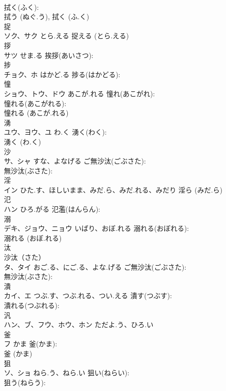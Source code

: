 \documentclass[8pt]{extreport}
\begin{document}
\begin{CJK}{UTF8}{min}
\\	拭く(ふく): 
\\	拭う (ぬぐ.う), 拭く (ふ.く)
\\	捉			
\\	ソク、サク	とら.える		捉える (とら.える)
\\	拶			
\\	サツ	せま.る	挨拶(あいさつ): 
\\	捗			
\\	チョク、ホ	はかど.る	捗る(はかどる): 
\\	憧			
\\	ショウ、トウ、ドウ	あこが.れる	憧れ(あこがれ): 
\\	憧れる(あこがれる): 
\\	憧れる (あこが.れる)
\\	湧			
\\	ユウ、ヨウ、ユ	わ.く	湧く(わく): 
\\	湧く (わ.く)
\\	沙			
\\	サ、シャ	すな、よなげる	ご無沙汰(ごぶさた): 
\\	無沙汰(ぶさた): 
\\	淫			
\\	イン	ひた.す、ほしいまま、みだ.ら、みだ.れる、みだり		淫ら (みだ.ら)
\\	氾			
\\	ハン	ひろ.がる	氾濫(はんらん): 
\\	溺			
\\	デキ、ジョウ、ニョウ	いばり、おぼ.れる	溺れる(おぼれる): 
\\	溺れる (おぼ.れる)
\\	汰			
\\	沙汰（さた）
\\	タ、タイ	おご.る、にご.る、よな.げる	ご無沙汰(ごぶさた): 
\\	無沙汰(ぶさた): 
\\	潰			
\\	カイ、エ	つぶ.す、つぶ.れる、つい.える	潰す(つぶす): 
\\	潰れる(つぶれる): 
\\	汎			
\\	ハン、ブ、フウ、ホウ、ホン	ただよ.う、ひろ.い		
\\	釜			
\\	フ	かま	釜(かま): 
\\	釜 (かま)
\\	狙			
\\	ソ、ショ	ねら.う、ねら.い	狙い(ねらい): 
\\	狙う(ねらう): 

\end{CJK}
\end{document}
